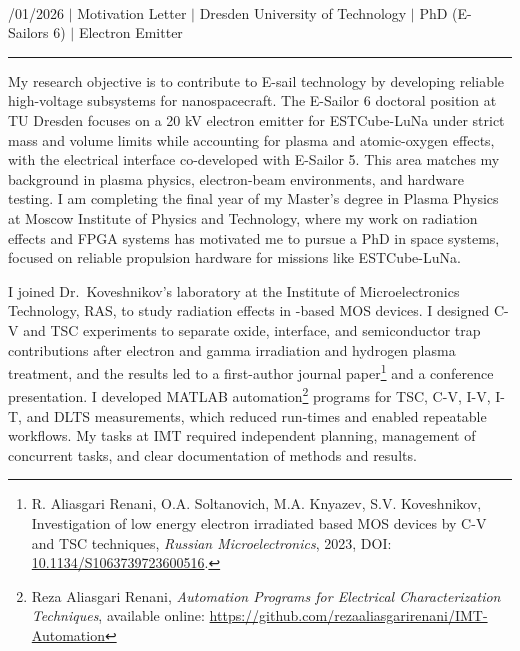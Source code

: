 \documentclass[a4paper,12pt]{article}
\begin{document}
{\centering
  {\scshape {}} \\ 
  {\fontsize{10}{10}/01/2026} $|$
  {\fontsize{10}{10}\selectfont Motivation Letter} $|$
  {\fontsize{10}{10}\selectfont Dresden University of Technology} $|$
  {\fontsize{10}{10}\selectfont PhD (E-Sailors 6)} $|$
  {\fontsize{10}{10}\selectfont Electron Emitter}
\par}
\vspace{-20pt}
\noindent\rule{\textwidth}{0.5pt}

\vspace{-10pt}

My research objective is to contribute to E-sail technology by developing reliable high-voltage subsystems for nanospacecraft. The E-Sailor 6 doctoral position at TU Dresden focuses on a 20 kV electron emitter for ESTCube-LuNa under strict mass and volume limits while accounting for plasma and atomic-oxygen effects, with the electrical interface co-developed with E-Sailor 5. This area matches my background in plasma physics, electron-beam environments, and hardware testing. I am completing the final year of my Master's degree in Plasma Physics at Moscow Institute of Physics and Technology, where my work on radiation effects and FPGA systems has motivated me to pursue a PhD in space systems, focused on reliable propulsion hardware for missions like ESTCube-LuNa.

I joined Dr.\ Koveshnikov's laboratory at the Institute of Microelectronics Technology, RAS, to study radiation effects in -based MOS devices. I designed C-V and TSC experiments to separate oxide, interface, and semiconductor trap contributions after electron and gamma irradiation and hydrogen plasma treatment, and the results led to a first-author journal paper\footnote{R. Aliasgari Renani, O.A. Soltanovich, M.A. Knyazev, S.V. Koveshnikov, Investigation of low energy electron irradiated  based MOS devices by C-V and TSC techniques, \textit{Russian Microelectronics}, 2023, DOI: \href{https://doi.org/10.1134/S1063739723600516}{10.1134/S1063739723600516}.} and a conference presentation. I developed MATLAB automation\footnote{Reza Aliasgari Renani, \textit{Automation Programs for Electrical Characterization Techniques}, available online: \href{https://github.com/rezaaliasgarirenani/IMT-Automation}{https://github.com/rezaaliasgarirenani/IMT-Automation}} programs for TSC, C-V, I-V, I-T, and DLTS measurements, which reduced run-times and enabled repeatable workflows. My tasks at IMT required independent planning, management of concurrent tasks, and clear documentation of methods and results.
\end{document}
